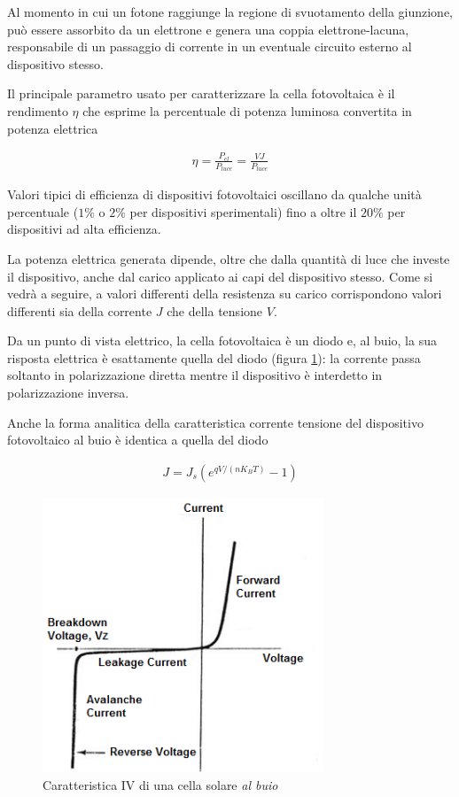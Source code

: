 \documentclass[17pt]{extarticle}
\begin{document}
Al momento in cui un fotone raggiunge la regione di svuotamento della giunzione, può essere assorbito da un elettrone e genera una coppia elettrone-lacuna, responsabile di un passaggio di corrente in un eventuale circuito esterno al dispositivo stesso.



Il principale parametro usato per caratterizzare la cella fotovoltaica è il rendimento $\eta$ che esprime la percentuale di potenza luminosa convertita in potenza elettrica

\begin{eqnarray}\label{eq:efficienza}
	\eta = \frac{P_{el}}{P_{luce}} = \frac{VJ}{P_{luce}}
\end{eqnarray}

Valori tipici di efficienza di dispositivi fotovoltaici oscillano da qualche unità percentuale ($1\%$ o $2\%$ per dispositivi sperimentali) fino a oltre il $20\%$ per dispositivi ad alta efficienza. 

La potenza elettrica generata dipende, oltre che dalla quantità di luce che investe il dispositivo, anche dal carico applicato ai capi del dispositivo stesso. Come si vedrà a seguire, a valori differenti della resistenza su carico corrispondono valori differenti sia della corrente $J$ che della tensione $V$.

\vspace{1cm}

Da un punto di vista elettrico, la cella fotovoltaica è un diodo e, al buio, la sua risposta elettrica è esattamente quella del diodo (figura \ref{fig:ivCharacteristicSolarCellDark}): la corrente passa soltanto in polarizzazione diretta mentre il dispositivo è interdetto in polarizzazione inversa. 


Anche la forma analitica della caratteristica corrente tensione del dispositivo fotovoltaico al buio è identica a quella del diodo

\begin{eqnarray}\label{eq:ivBuio}
	J = J_s\left(e^{qV/(nK_BT)}-1\right)
\end{eqnarray}

\begin{figure}[t!]		
	\centering
   	\includegraphics[width=3.3in]{ivCharacteristicsSolarCellDark.png}
  	\caption{Caratteristica IV di una cella solare \emph{al buio} }
   	\label{fig:ivCharacteristicSolarCellDark}
\end{figure}
\end{document}
